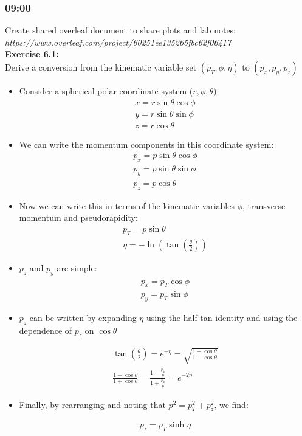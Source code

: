 \subsubsection*{09:00}
Create shared overleaf document to share plots and lab notes:
\\
\textit{https://www.overleaf.com/project/60251ee135265fbc62f06417}
\\
\textbf{Exercise 6.1:}
\\
Derive a conversion from the kinematic variable set $(p_T, \phi, \eta)$ to $(p_x, p_y, p_z)$
\begin{itemize}
     
\item{Consider a spherical polar coordinate system ($r,\phi,\theta$):}
\begin{align}
    x = r\sin\theta\cos\phi\\
    y = r\sin\theta\sin\phi\\   z=r\cos\theta
\end{align}
\item{We can write the momentum components in this coordinate system:}
\begin{align}
    p_x = p\sin\theta\cos\phi \\
    p_y = p\sin\theta\sin\phi \\ p_z=p\cos\theta
\end{align}

\item{Now we can write this in terms of the kinematic variables $\phi$, transverse momentum and pseudorapidity:}
\begin{align}
  p_T = p\sin\theta \\
  \eta = -\ln{\left(\tan\left(\frac{\theta}{2}\right)\right)}
\end{align}

\item{$p_z$ and $p_y$ are simple:}
\begin{align}
    p_x = p_T\cos\phi\\
    p_y = p_T\sin\phi
\end{align}

\item{$p_z$ can be written by expanding  $\eta$ using the half tan identity and using the dependence of $p_z$ on $\cos\theta$}

\begin{align}
    \tan\left(\frac{\theta}{2}\right)= e^{-\eta}= \sqrt{\frac{1-\cos\theta}{1+\cos\theta}}\\
    \frac{1-\cos\theta}{1+\cos\theta} =    \frac{1-\frac{p_z}{p}}{1+\frac{p_z}{p}} =e^{-2\eta}
\end{align}

\item{Finally, by rearranging and noting that $p^2 = p_T^2 + p_z^2$,  we find:}

\begin{align}
    p_z = p_T\sinh\eta
\end{align}
\end{itemize}

